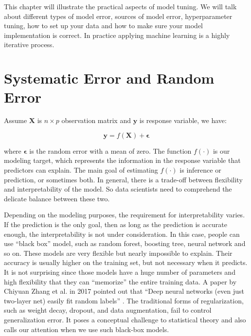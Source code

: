 \documentclass[12pt,]{krantz}
\theoremstyle{definition}
\theoremstyle{definition}
\theoremstyle{remark}
\begin{document}
This chapter will illustrate the practical aspects of model tuning. We
will talk about different types of model error, sources of model error,
hyperparameter tuning, how to set up your data and how to make sure your
model implementation is correct. In practice applying machine learning
is a highly iterative process.

\section{Systematic Error and Random
Error}\label{systematic-error-and-random-error}

Assume \(\mathbf{X}\) is \(n \times p\) observation matrix and
\(\mathbf{y}\) is response variable, we have:

\[\mathbf{y}=f(\mathbf{X})+\mathbf{\epsilon}\]

where \(\mathbf{\epsilon}\) is the random error with a mean of zero. The
function \(f(\cdot)\) is our modeling target, which represents the
information in the response variable that predictors can explain. The
main goal of estimating \(f(\cdot)\) is inference or prediction, or
sometimes both. In general, there is a trade-off between flexibility and
interpretability of the model. So data scientists need to comprehend the
delicate balance between these two.

Depending on the modeling purposes, the requirement for interpretability
varies. If the prediction is the only goal, then as long as the
prediction is accurate enough, the interpretability is not under
consideration. In this case, people can use ``black box'' model, such as
random forest, boosting tree, neural network and so on. These models are
very flexible but nearly impossible to explain. Their accuracy is
usually higher on the training set, but not necessary when it predicts.
It is not surprising since those models have a huge number of parameters
and high flexibility that they can ``memorize'' the entire training
data. A paper by Chiyuan Zhang et al. in 2017 pointed out that ``Deep
neural networks (even just two-layer net) easily fit random labels''
\citep{rethinkDL}. The traditional forms of regularization, such as
weight decay, dropout, and data augmentation, fail to control
generalization error. It poses a conceptual challenge to statistical
theory and also calls our attention when we use such black-box models.
\end{document}
